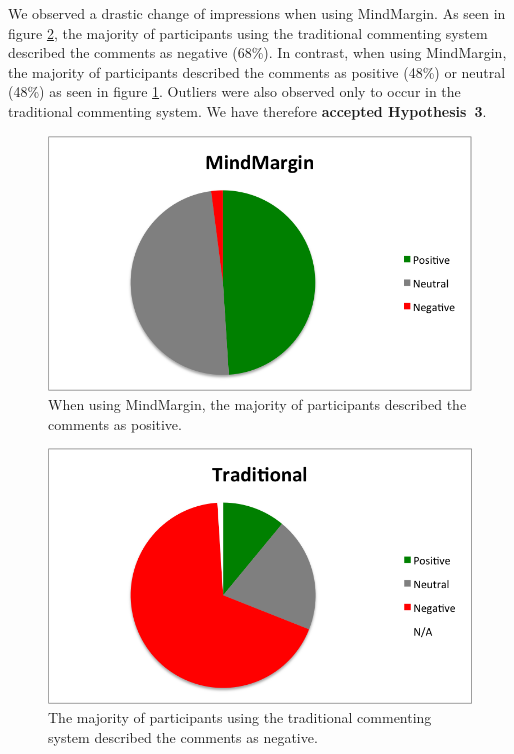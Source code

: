 We observed a drastic change of impressions when using MindMargin. As seen in figure \ref{fig:trad_pie}, the majority of participants using the traditional commenting system described the comments as negative (68\%). In contrast, when using MindMargin, the majority of participants described the comments as positive (48\%) or neutral (48\%) as seen in figure \ref{fig:mm_pie}.  Outliers were also observed only to occur in the traditional commenting system. We have therefore \textbf{accepted Hypothesis~3}. 

\begin{figure}[h]
\centering
\includegraphics[scale=0.5]{mm_piechart.png}
\caption{When using MindMargin, the majority of participants described the comments as positive.}
\label{fig:mm_pie}
\end{figure}

\begin{figure}[h]
\centering
\includegraphics[scale=0.5]{traditional_piechart.png}
\caption{The majority of participants using the traditional commenting system described the comments as negative.}
\label{fig:trad_pie}
\end{figure}


